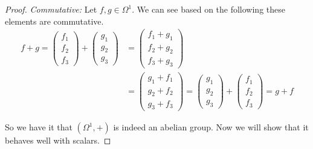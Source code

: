 \documentclass[12pt]{article}
\begin{document}
\begin{itemize}
\begin{itemize}
\begin{proof}
                \newpage
                \textit{Commutative:} Let $f,g\in \Omega^1$. We can see based on the following these elements are commutative.
                \begin{align}
                    f + g = \begin{pmatrix}f_1 \\ f_2 \\ f_3 \end{pmatrix} + \begin{pmatrix} g_1 \\ g_2 \\ g_3\end{pmatrix} &= \begin{pmatrix} f_1 + g_1 \\ f_2 +g_2 \\ f_3 + g_3 \end{pmatrix} \\
                    &=\begin{pmatrix} g_1 + f_1 \\ g_2 +f_2 \\ g_3 + f_3 \end{pmatrix} =  \begin{pmatrix} g_1 \\ g_2 \\ g_3\end{pmatrix} + \begin{pmatrix}f_1 \\ f_2 \\ f_3 \end{pmatrix} = g + f
                \end{align}

                So we have it that $(\Omega^1,+)$ is indeed an abelian group. Now we will show that it behaves well with scalars. 


\end{proof}
\end{itemize}
\end{itemize}
\end{document}
